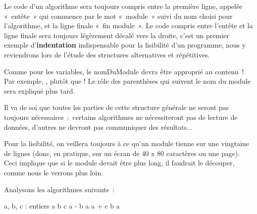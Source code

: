 		\begin{liste}
		\item {
			Le code d’un algorithme sera toujours compris entre la
			première ligne, appelée «~entête~» qui commence par 
			le mot «~module~»
			suivi du nom choisi pour l’algorithme, et la ligne
			finale «~fin module~». Le code compris entre l’entête
			et la ligne finale sera toujours légèrement décalé vers la droite,
			c’est un premier exemple
			d’\textbf{indentation} indispensable pour la
			lisibilité d’un programme, nous y reviendrons lors de
			l’étude des structures alternatives et répétitives.}
		\item {
			Comme pour les variables, le nomDuModule devra être approprié au
            contenu~! Par exemple, , 
			 plutôt que 
			!
			Le rôle des parenthèses qui suivent le nom du module sera expliqué plus
			tard.}
		\item {
			Il va de soi que toutes les parties de cette structure générale ne
			seront pas toujours nécessaires~:~certains algorithmes ne nécessiteront
			pas de lecture de données, d’autres ne devront pas
			communiquer des résultats...}
		\item {
			Pour la lisibilité, on veillera toujours à ce qu’un module
			tienne sur une vingtaine de lignes (donc, en pratique, sur un écran 
			de 40 x 80 caractères ou une page). Ceci implique que si le module 
			devait être plus long, il faudrait le découper, comme nous le verrons 
			plus loin.}
		\end{liste}

		\bigskip

		Analysons les algorithmes suivants~:
		
		\begin{Pseudocode}
			\Decl a, b, c : entiers
			\Let a \Gets 12
			\Let b \Gets 5
			\Let c \Gets a - b
			\Let a \Gets a + c
			\Let b \Gets a
		\EndModule
		\end{Pseudocode}
		
